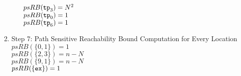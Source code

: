\begin{enumerate}
\begin{itemize}
    $psRB(\mathtt{tp}_3) = N^2$ \\
    $psRB(\mathtt{tp}_0) = 1$ \\
    $psRB(\mathtt{tp}_6) = 1$ 
\end{itemize}
\item Step 7: Path Sensitive Reachability Bound Computation for Every Location
\\
$psRB(\{0, 1\}) = 1$ \\
$psRB(\{2, 3\}) = n - N$ \\
$psRB(\{9, 1\}) = n - N$ \\
$psRB(\{\mathtt{ex}\}) = 1$ 
\end{enumerate}